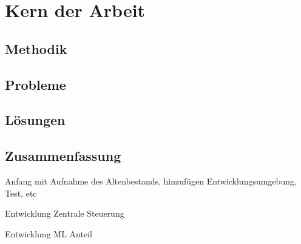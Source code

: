 \chapter{Kern der Arbeit}



\section{Methodik}

\section{Probleme}

\section{Lösungen}



\section{Zusammenfassung}

\begin{neu}
  Anfang mit Aufnahme des Altenbestands, hinzufügen Entwicklungsumgebung, Test, etc

  Entwicklung Zentrale Steuerung

  Entwicklung ML Anteil
\end{neu}